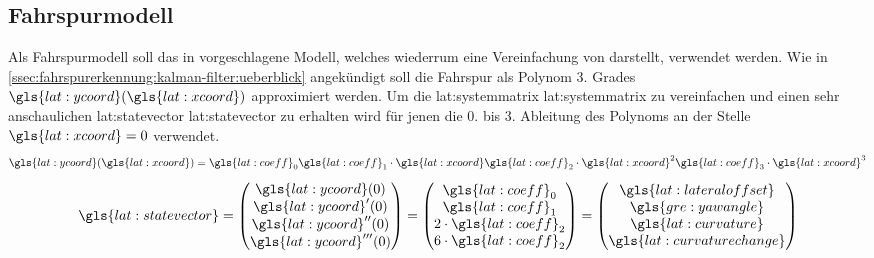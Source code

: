 \subsection{Fahrspurmodell}
Als Fahrspurmodell soll das in \autocite{petersfalkoFPGAbasierteBildverarbeitungspipelineZur2009} vorgeschlagene Modell, welches wiederrum eine Vereinfachung von \autocite{risackRobustLaneRecognition} darstellt, verwendet werden.
Wie in \ref{ssec:fahrspurerkennung:kalman-filter:ueberblick} angekündigt soll die Fahrspur als Polynom 3. Grades \begin{math} \gls{lat:ycoord}(\gls{lat:xcoord}) \end{math} approximiert werden. Um die \glsdesc{lat:systemmatrix} \gls{lat:systemmatrix} zu vereinfachen und einen sehr anschaulichen \glsdesc{lat:statevector} \gls{lat:statevector} zu erhalten wird für jenen die 0. bis 3. Ableitung des Polynoms an der Stelle \begin{math} \gls{lat:xcoord}=0 \end{math} verwendet. 
\begin{equation}
\label{eq:polylane}
\gls{lat:ycoord}(\gls{lat:xcoord}) =
\gls{lat:coeff}_0
\gls{lat:coeff}_1 \cdot \gls{lat:xcoord}
\gls{lat:coeff}_2 \cdot \gls{lat:xcoord}^2
\gls{lat:coeff}_3 \cdot \gls{lat:xcoord}^3
\end{equation}
\begin{equation}
\label{eq:statevectorlane}
\gls{lat:statevector} = 
\begin{pmatrix}
\gls{lat:ycoord}(0) \\
\gls{lat:ycoord}^\prime(0) \\
\gls{lat:ycoord}^{\prime\prime}(0) \\
\gls{lat:ycoord}^{\prime\prime\prime}(0) \\
\end{pmatrix}
=
\begin{pmatrix}
\gls{lat:coeff}_0 \\
\gls{lat:coeff}_1 \\
2 \cdot \gls{lat:coeff}_2 \\
6 \cdot \gls{lat:coeff}_2 \\
\end{pmatrix}
=
\begin{pmatrix}
\gls{lat:lateraloffset} \\
\gls{gre:yawangle} \\
\gls{lat:curvature} \\
\gls{lat:curvaturechange} \\
\end{pmatrix}
\end{equation}
 
